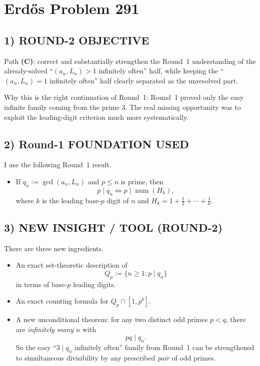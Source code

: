 \section{Erd\H{o}s Problem 291}

\subsection*{1) ROUND-2 OBJECTIVE}
Path \textbf{(C)}: correct and substantially strengthen the Round~1 understanding of the already-solved ``$(a_n,L_n)>1$ infinitely often'' half, while keeping the ``$(a_n,L_n)=1$ infinitely often'' half clearly separated as the unresolved part.

Why this is the right continuation of Round~1: Round~1 proved only the easy infinite family coming from the prime $3$. The real missing opportunity was to exploit the leading-digit criterion much more systematically.

\subsection*{2) Round-1 FOUNDATION USED}
I use the following Round~1 result.

\begin{itemize}
	\item[(F1)] If $q_n:=\gcd(a_n,L_n)$ and $p\le n$ is prime, then
	\[
	p\mid q_n
	\iff
	p\mid \operatorname{num}(H_k),
	\]
	where $k$ is the leading base-$p$ digit of $n$ and $H_k=1+\frac12+\cdots+\frac1k$.
\end{itemize}

\subsection*{3) NEW INSIGHT / TOOL (ROUND-2)}
There are three new ingredients.

\begin{itemize}
	\item[(N1)] An exact set-theoretic description of
	\[
	Q_p:=\{n\ge 1: p\mid q_n\}
	\]
	in terms of base-$p$ leading digits.
	
	\item[(N2)] An exact counting formula for $Q_p\cap [1,p^b]$.
	
	\item[(N3)] A new unconditional theorem: for any two distinct odd primes $p<q$, there are \emph{infinitely many} $n$ with
	\[
	pq\mid q_n.
	\]
	So the easy ``$3\mid q_n$ infinitely often'' family from Round~1 can be strengthened to simultaneous divisibility by any prescribed \emph{pair} of odd primes.
\end{itemize}

